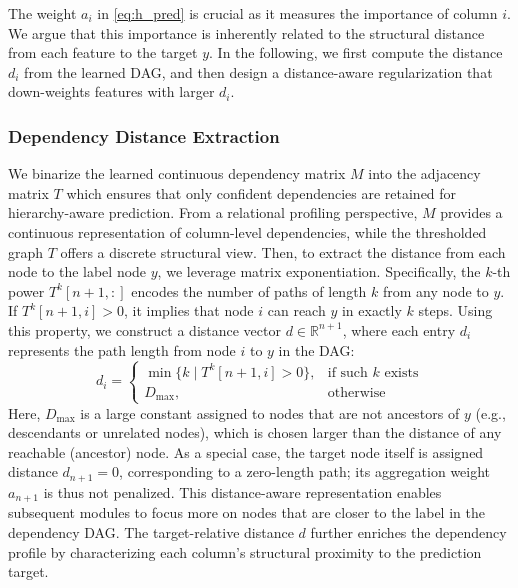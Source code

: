\documentclass[conference]{IEEEtran}
\newcommand{\syadd}[1]{{\color{black}#1}}
\newcommand{\syfix}[1]{{\color{black}#1}}
\newcommand{\zjic}[1]{{\color{black}#1}}
\newcommand{\syic}[1]{{\color{black}#1}}
\begin{document}
\syfix{
The weight $a_i$ in \eqref{eq:h_pred} is crucial as it measures the importance of column $i$. 
We argue that this importance is inherently related to the \syic{structural} distance from each feature to the target $y$. 
In the following, we first compute the distance $d_i$ from the learned DAG, and then design a distance-aware regularization that down-weights features with larger $d_i$.
}

\subsubsection{\syic{Dependency Distance} Extraction}
\syadd{
\zjic{We binarize the learned} \syic{continuous dependency} matrix $M$ into the adjacency matrix $T$
which ensures that only confident dependencies are retained for hierarchy-aware prediction.
}
\syic{From a relational profiling perspective, $M$ provides a continuous representation of column-level dependencies, while the thresholded graph $T$ offers a discrete structural view.}
Then, to extract the distance from each node to the label node $y$, we leverage matrix exponentiation. Specifically, the $k$-th power $T^k[n+1, :]$ encodes the number of paths of length $k$ from any node to $y$. If $T^k[n+1, i] > 0$, it implies that node $i$ can reach $y$ in exactly $k$ steps. Using this property, we construct a distance vector $d \in \mathbb{R}^{n+1}$, where each entry $d_i$ represents the path length from node $i$ to $y$ in the DAG:
\begin{equation}
    d_i = 
    \begin{cases}
    \min\{k \mid T^k[n+1, i] > 0\}, & \text{if such } k \text{ exists} \\
    D_{\max}, & \text{otherwise}
    \end{cases}
    \label{eq:distance_matrix}
\end{equation}
\noindent
Here, $D_{\max}$ is a large constant assigned to nodes that are not ancestors of $y$ (e.g., descendants or unrelated nodes), \syic{which is chosen larger than the distance of any reachable (ancestor) node}. %
\syic{As a special case, the target node itself is assigned distance $d_{n+1} = 0$, corresponding to a zero-length path; its aggregation weight $a_{n+1}$ is thus not penalized.}
This distance-aware representation enables subsequent modules to focus more on nodes that are \syic{closer to the label in the dependency DAG. The target-relative distance $d$ further enriches the dependency profile by characterizing each column's structural proximity to the prediction target.}
\end{document}
